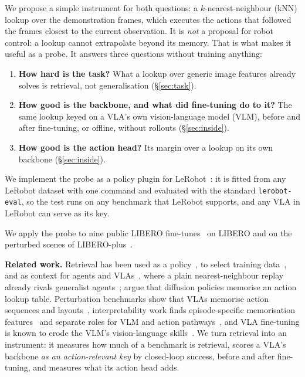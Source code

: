 \documentclass{article}
\begin{document}
We propose a simple instrument for both questions: a $k$-nearest-neighbour (kNN) lookup over the demonstration frames,
which executes the actions that followed the frames closest to the current observation. It is \emph{not} a proposal
for robot control: a lookup cannot extrapolate beyond its memory. That is what makes it useful as a probe. It answers
three questions without training anything:
\begin{enumerate}
  \item \textbf{How hard is the task?} What a lookup over generic image features already solves is retrieval, not
        generalisation (\S\ref{sec:task}).
  \item \textbf{How good is the backbone, and what did fine-tuning do to it?} The same lookup keyed on a VLA's own
        vision-language model (VLM), before and after fine-tuning, or offline, without rollouts (\S\ref{sec:inside}).
  \item \textbf{How good is the action head?} Its margin over a lookup on its own backbone (\S\ref{sec:inside}).
\end{enumerate}
We implement the probe as a policy plugin for LeRobot~\citep{cadene2024lerobot}: it is fitted from any LeRobot
dataset with one command and evaluated with the standard \texttt{lerobot-eval}, so the test runs on any benchmark that
LeRobot supports, and any VLA in LeRobot can serve as its key.

We apply the probe to nine public LIBERO fine-tunes~\citep{pi2025pi05,fang2026molmoact2,sun2026vlajepa,lin2026evo1,
nvidia2025gr00t,zheng2026xvla,pertsch2025fast,shukor2025smolvla,black2024pi0} on LIBERO and on the perturbed scenes of
LIBERO-plus~\citep{fei2025liberoplus}.

\textbf{Related work.} Retrieval has been used as a policy~\citep{pari2022vinn,he2025alt,mishra2026cfdp}, to select
training data~\citep{du2023behaviorretrieval,memmel2025strap}, and as context for agents and
VLAs~\citep{sridhar2025regent,sridhar2025ricl}, where a plain nearest-neighbour replay already rivals generalist
agents~\citep{sridhar2025regent}; \citet{he2025alt} argue that diffusion policies memorise an action lookup table.
Perturbation benchmarks show that VLAs memorise action sequences and layouts~\citep{fei2025liberoplus,zhou2025liberopro,
xu2025affordance}, interpretability work finds episode-specific memorisation features~\citep{swann2026sae} and separate
roles for VLM and action pathways~\citep{grant2026features}, and VLA fine-tuning is known to erode the VLM's
vision-language skills~\citep{driess2025insulating,grover2025preserving,zhang2026vlm4vla}. We turn retrieval into an
instrument: it measures how much of a benchmark is retrieval, scores a VLA's backbone \emph{as an action-relevant key}
by closed-loop success, before and after fine-tuning, and measures what its action head adds.
\end{document}
